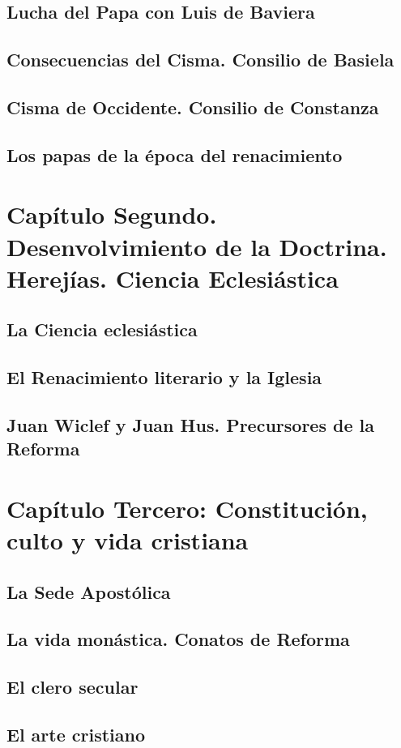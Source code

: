 \raggedbottom{} \documentclass[12pt, a4paper]{book}
\begin{document}
\section{Lucha del Papa con Luis de Baviera}
\section{Consecuencias del Cisma. Consilio de Basiela}
\section{Cisma de Occidente. Consilio de Constanza}
\section{Los papas de la época del renacimiento}
\chapter{Capítulo Segundo. Desenvolvimiento de la Doctrina. Herejías. Ciencia Eclesiástica}
\section{La Ciencia eclesiástica}
\section{El Renacimiento literario y la Iglesia}
\section{Juan Wiclef y Juan Hus. Precursores de la Reforma}
\chapter{Capítulo Tercero: Constitución, culto y vida cristiana}
\section{La Sede Apostólica}
\section{La vida monástica. Conatos de Reforma}
\section{El clero secular}
\section{El arte cristiano}
\end{document}
